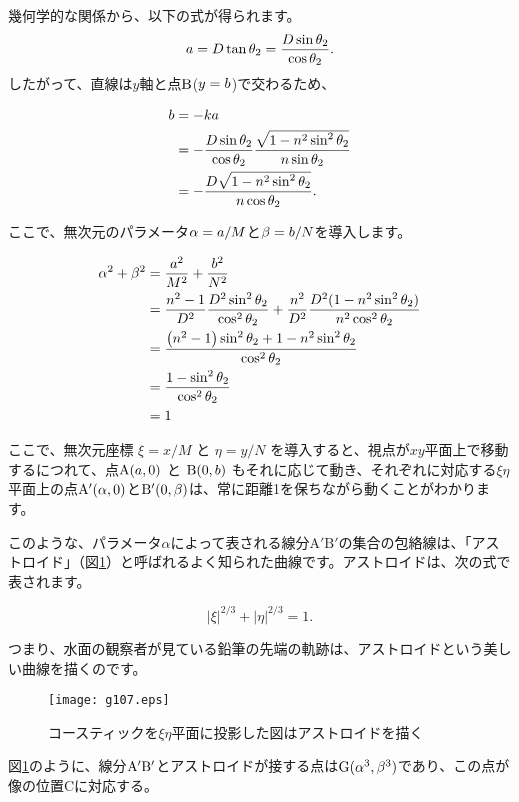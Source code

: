 \documentclass[twocolumn]{article}
\begin{document}
	幾何学的な関係から、以下の式が得られます。
	$${a} = D\tan\theta_2 = \dfrac{D\sin\theta_2}{\cos\theta_2}.$$
	したがって、直線は$y$軸と点$\mathrm{{B}}$($y={b}$)で交わるため、
	
	$$\begin{aligned}
		{b} &= -k{a} \\
		&= -\dfrac{D\sin\theta_2}{\cos\theta_2}
		\dfrac{\sqrt{1-n^2\sin^2\theta_2}}{n\sin\theta_2}\\
		&=-\dfrac{D\sqrt{1-n^2\sin^2\theta_2}}{n\cos\theta_2}.
	\end{aligned}$$
	
	ここで、無次元のパラメータ${\alpha}={a}/M$と${\beta}={b}/N$を導入します。
	
	$$ \begin{aligned}
		\greeka^2 + \greekb^2 &= \dfrac{\romana^2}{M^2}+\dfrac{\romanb^2}{N^2}\\
		&=\dfrac{n^2-1}{D^2}\dfrac{D^2\sin^2\theta_2}{\cos^2\theta_2}%
		+\dfrac{n^2}{D^2}\dfrac{D^2(1-n^2\sin^2\theta_2)}{n^2\cos^2\theta_2}\\
		&=\dfrac{\left(n^2-1\right)\sin^2\theta_2 + 1-n^2\sin^2\theta_2}
		{\cos^2\theta_2}\\
		&=\dfrac{1-\sin^2\theta_2}{\cos^2\theta_2}\\
		&= 1
	\end{aligned}$$
	
	ここで、無次元座標 $\xi=x/M$ と $\eta=y/N$ を導入すると、視点が$xy$平面上で移動するにつれて、点$\mathrm{A}({a}, 0)$ と $\mathrm{B}(0, {b})$ もそれに応じて動き、それぞれに対応する$\xi\eta$平面上の点$\mathrm{A'}({\alpha}, 0)$と$\mathrm{B'}(0, {\beta})$は、常に距離1を保ちながら動くことがわかります。
	
	このような、パラメータ$\alpha$によって表される線分${\mathrm{A'B'}}$の集合の包絡線は、「アストロイド」（図\ref{fig:astroid}）と呼ばれるよく知られた曲線です。アストロイドは、次の式で表されます。
	
	$$ \left| \xi \right|^{2/3} + \left| \eta \right|^{2/3} = 1. $$
	
	つまり、水面の観察者が見ている鉛筆の先端の軌跡は、アストロイドという美しい曲線を描くのです。
	
	\begin{figure}[h]
		\centering
		\texttt{[image: g107.eps]}	
		\caption{コースティックを$\xi\eta$平面に投影した図はアストロイドを描く}
		\label{fig:astroid}
	\end{figure}
	
	図\ref{fig:astroid}のように、線分${\mathrm{{A^{\prime}}{B^{\prime}}}}$とアストロイドが接する点は$\mathrm{G}({\alpha}^3, {\beta}^3)$であり、この点が像の位置$\mathrm{C}$に対応する。
	
\end{document}
